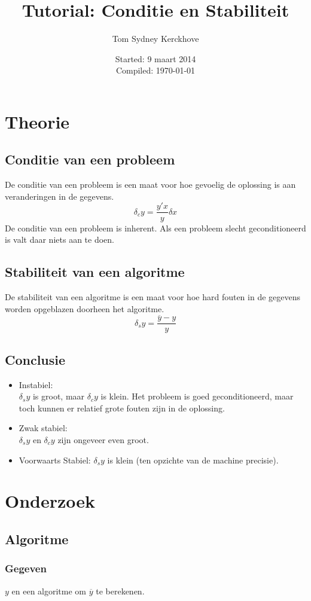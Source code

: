 \documentclass[10pt,a4paper]{article}
\author{Tom Sydney Kerckhove}
\title{Tutorial: Conditie en Stabiliteit}
\date{Started: 9 maart 2014\\Compiled: \today}
\begin{document}
\maketitle
\tableofcontents
\pagebreak

\section{Theorie}
\subsection{Conditie van een probleem}
De conditie van een probleem is een maat voor hoe gevoelig de oplossing is aan veranderingen in de gegevens.
\[
\delta_c y = \frac{y'x}{y}\delta x
\]
De conditie van een probleem is inherent. Als een probleem slecht geconditioneerd is valt daar niets aan te doen.

\subsection{Stabiliteit van een algoritme}
De stabiliteit van een algoritme is een maat voor hoe hard fouten in de gegevens worden opgeblazen doorheen het algoritme.
\[
\delta_s y = \frac{\overline{y}-y}{y}
\]

\subsection{Conclusie}
\begin{itemize}
\item Instabiel:\\
$\delta_s y$ is groot, maar $\delta_c y$ is klein. Het probleem is goed geconditioneerd, maar toch kunnen er relatief grote fouten zijn in de oplossing.
\item Zwak stabiel:\\
$\delta_s y$ en $\delta_c y$ zijn ongeveer even groot.
\item Voorwaarts Stabiel:
$\delta_s y$ is klein (ten opzichte van de machine precisie).
\end{itemize}

\section{Onderzoek}
\subsection{Algoritme}
\subsubsection{Gegeven}
$y$ en een algoritme om $\overline{y}$ te berekenen.
\end{document}
